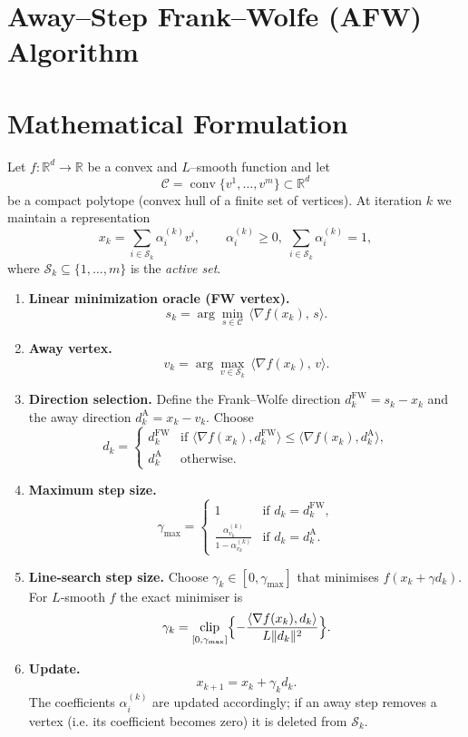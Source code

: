 \documentclass{article}
\newcommand{\R}{\mathbb{R}}
\newcommand{\C}{\mathcal{C}}
\begin{document}
\section*{Away–Step Frank–Wolfe (AFW) Algorithm}

\section*{Mathematical Formulation}
Let $f:\R^{d}\rightarrow\R$ be a convex and $L$–smooth function and let 
\[
\C = \operatorname{conv}\{v^{1},\dots ,v^{m}\}\subset\R^{d}
\]
be a compact polytope (convex hull of a finite set of vertices).  
At iteration $k$ we maintain a representation
\[
x_{k}= \sum_{i\in \mathcal{S}_{k}} \alpha_{i}^{(k)} v^{i},
\qquad 
\alpha_{i}^{(k)}\ge 0,\; \sum_{i\in \mathcal{S}_{k}}\alpha_{i}^{(k)}=1,
\]
where $\mathcal{S}_{k}\subseteq\{1,\dots ,m\}$ is the \emph{active set}.

\begin{enumerate}[label=\textbf{Step \arabic*:},leftmargin=*]
\item \textbf{Linear minimization oracle (FW vertex).}
\[
s_{k}= \arg\min_{s\in \C}\,\langle \nabla f(x_{k}),\,s\rangle .
\]
\item \textbf{Away vertex.}
\[
v_{k}= \arg\max_{v\in \mathcal{S}_{k}}\,\langle \nabla f(x_{k}),\,v\rangle .
\]
\item \textbf{Direction selection.}
Define the Frank–Wolfe direction $d^{\text{FW}}_{k}=s_{k}-x_{k}$ and the away direction
$d^{\text{A}}_{k}=x_{k}-v_{k}$.  Choose
\[
d_{k}= 
\begin{cases}
d^{\text{FW}}_{k} & \text{if } \langle \nabla f(x_{k}),d^{\text{FW}}_{k}\rangle 
\le \langle \nabla f(x_{k}),d^{\text{A}}_{k}\rangle ,\\[4pt]
d^{\text{A}}_{k} & \text{otherwise}.
\end{cases}
\]
\item \textbf{Maximum step size.}
\[
\gamma_{\max }=
\begin{cases}
1 & \text{if } d_{k}=d^{\text{FW}}_{k},\\[4pt]
\displaystyle\frac{\alpha_{v_{k}}^{(k)}}{1-\alpha_{v_{k}}^{(k)}} & \text{if } d_{k}=d^{\text{A}}_{k}.
\end{cases}
\]
\item \textbf{Line‑search step size.}  Choose $\gamma_{k}\in[0,\gamma_{\max}]$ that
minimises $f(x_{k}+ \gamma d_{k})$.  For $L$‑smooth $f$ the exact minimiser is
\[
\gamma_{k}= \operatorname*{clip}_{[0,\gamma_{\max}]}
\Bigl\{-\frac{\langle \nabla f(x_{k}),d_{k}\rangle}{L\|d_{k}\|^{2}}\Bigr\}.
\]
\item \textbf{Update.}
\[
x_{k+1}=x_{k}+ \gamma_{k} d_{k}.
\]
The coefficients $\alpha_{i}^{(k)}$ are updated accordingly; if an away step
removes a vertex (i.e. its coefficient becomes zero) it is deleted from
$\mathcal{S}_{k}$.
\end{enumerate}
\end{document}
